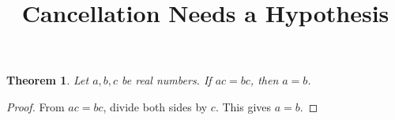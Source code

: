 \documentclass{article}
\title{Cancellation Needs a Hypothesis}
\author{}
\date{}
\newtheorem{theorem}{Theorem}
\begin{document}
\maketitle

\begin{theorem}\label{thm:cancellation}
Let $a,b,c$ be real numbers. If $ac=bc$, then $a=b$.
\end{theorem}
\begin{proof}
From $ac=bc$, divide both sides by $c$. This gives $a=b$.
\end{proof}
\end{document}
